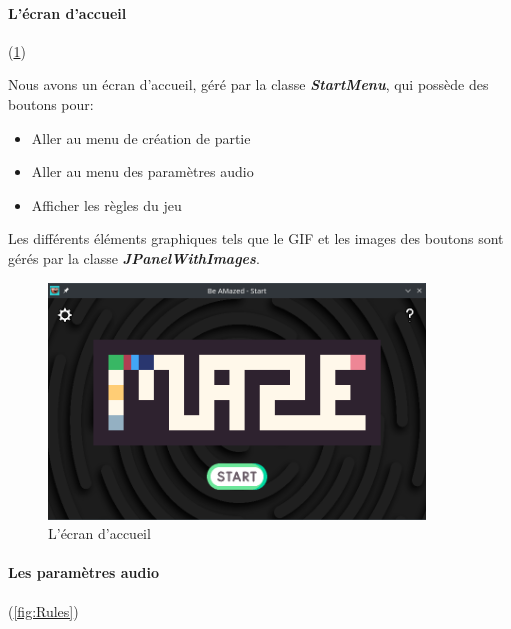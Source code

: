 \paragraph{L'écran d'accueil} (\ref{fig:StartMenu})

Nous avons un écran d'accueil, géré par la classe \textbf{\textit{StartMenu}}, qui possède des boutons pour:

\begin{itemize}
    \item Aller au menu de création de partie
    \item Aller au menu des paramètres audio
    \item Afficher les règles du jeu
\end{itemize}

Les différents éléments graphiques tels que le GIF et les images des boutons sont gérés par la classe \textbf{\textit{JPanelWithImages}}.

\begin{figure}[h!]
    \centering
    \includegraphics[width=10cm]{ressources/Implementation/Labyrinthe/Controleur/StartMenu.png}%
    \caption{L'écran d'accueil}
    \label{fig:StartMenu}
\end{figure}
\FloatBarrier

\paragraph{Les paramètres audio} (\ref{fig:Rules})

